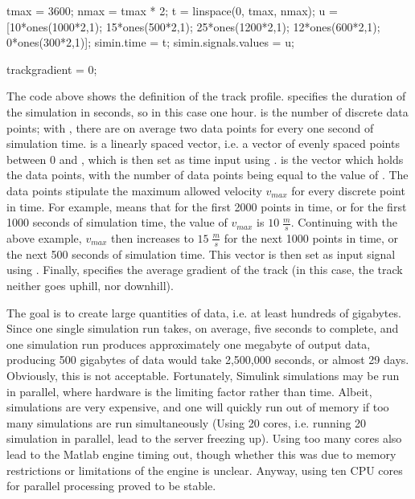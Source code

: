 \bigskip
\begin{python}
tmax = 3600;
nmax = tmax * 2;
t = linspace(0, tmax, nmax);
u = [10*ones(1000*2,1); 15*ones(500*2,1); 25*ones(1200*2,1); 12*ones(600*2,1); 0*ones(300*2,1)];
simin.time = t;
simin.signals.values = u;

trackgradient = 0;
\end{python}
\bigskip

\noindent
The code above shows the definition of the track profile.  specifies the duration of the simulation in seconds, so in this case one hour.  is the number of discrete data points; with , there are on average two data points for every one second of simulation time.  is a linearly spaced vector, i.e. a vector of  evenly spaced points between 0 and , which is then set as time input using .  is the vector which holds the data points, with the number of data points being equal to the value of . The data points stipulate the maximum allowed velocity $v_{max}$ for every discrete point in time. For example,  means that for the first 2000 points in time, or for the first 1000 seconds of simulation time, the value of $v_{max}$ is $10 \; \frac{m}{s}$. Continuing with the above example, $v_{max}$ then increases to $15 \; \frac{m}{s}$ for the next 1000 points in time, or the next 500 seconds of simulation time. This vector  is then set as input signal using . Finally,  specifies the average gradient of the track (in this case, the track neither goes uphill, nor downhill).
\par
The goal is to create large quantities of data, i.e. at least hundreds of gigabytes. Since one single simulation run takes, on average, five seconds to complete, and one simulation run produces approximately one megabyte of output data, producing 500 gigabytes of data would take 2,500,000 seconds, or almost 29 days. Obviously, this is not acceptable. Fortunately, Simulink simulations may be run in parallel, where hardware is the limiting factor rather than time. Albeit, simulations are very expensive, and one will quickly run out of memory if too many simulations are run simultaneously (Using 20 cores, i.e. running 20 simulation in parallel, lead to the server freezing up). Using too many cores also lead to the Matlab engine timing out, though whether this was due to memory restrictions or limitations of the engine is unclear. Anyway, using ten CPU cores for parallel processing proved to be stable.

